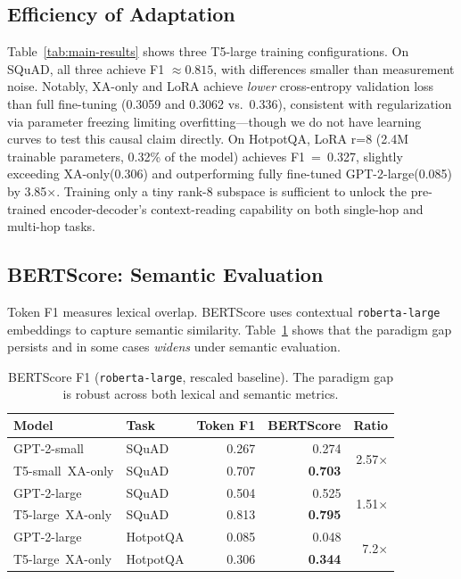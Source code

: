 \documentclass[11pt]{article}
\newcommand{\tssmall}{T5-small\xspace}
\newcommand{\tslarge}{T5-large\xspace}
\newcommand{\gptsmall}{GPT-2-small\xspace}
\newcommand{\gptlarge}{GPT-2-large\xspace}
\newcommand{\xaonly}{XA-only\xspace}
\newcommand{\squad}{SQuAD\xspace}
\newcommand{\hotpotqa}{HotpotQA\xspace}
\begin{document}
\subsection{Efficiency of Adaptation}
\label{sec:efficiency}

Table~\ref{tab:main-results} shows three T5-large training configurations.
On \squad, all three achieve F1 $\approx 0.815$, with differences smaller than
measurement noise.
Notably, \xaonly and LoRA achieve \emph{lower} cross-entropy validation loss
than full fine-tuning (0.3059 and 0.3062 vs.\ 0.336), consistent with
regularization via parameter freezing limiting overfitting---though we do not
have learning curves to test this causal claim directly.
On \hotpotqa, LoRA r=8 (2.4M trainable parameters, 0.32\% of the model)
achieves F1~=~0.327, slightly exceeding \xaonly (0.306) and outperforming
fully fine-tuned \gptlarge (0.085) by 3.85$\times$.
Training only a tiny rank-8 subspace is sufficient to unlock the pre-trained
encoder-decoder's context-reading capability on both single-hop and multi-hop tasks.

\subsection{BERTScore: Semantic Evaluation}
\label{sec:bertscore}

Token F1 measures lexical overlap.
BERTScore \citep{zhang2020bertscore} uses contextual \texttt{roberta-large}
embeddings to capture semantic similarity.
Table~\ref{tab:bertscore} shows that the paradigm gap persists and in some cases
\emph{widens} under semantic evaluation.

\begin{table}[t]
  \centering
  \small
  \caption{BERTScore F1 (\texttt{roberta-large}, rescaled baseline).
  The paradigm gap is robust across both lexical and semantic metrics.}
  \label{tab:bertscore}
  \begin{tabular}{llrrr}
    \toprule
    Model & Task & Token F1 & BERTScore & Ratio \\
    \midrule
    \gptsmall  & \squad    & 0.267 & 0.274 & \multirow{2}{*}{2.57$\times$} \\
    \tssmall~\xaonly & \squad    & 0.707 & \textbf{0.703} & \\
    \midrule
    \gptlarge  & \squad    & 0.504 & 0.525 & \multirow{2}{*}{1.51$\times$} \\
    \tslarge~\xaonly & \squad    & 0.813 & \textbf{0.795} & \\
    \midrule
    \gptlarge  & \hotpotqa & 0.085 & 0.048 & \multirow{2}{*}{7.2$\times$} \\
    \tslarge~\xaonly & \hotpotqa & 0.306 & \textbf{0.344} & \\
    \bottomrule
  \end{tabular}
\end{table}
\end{document}
